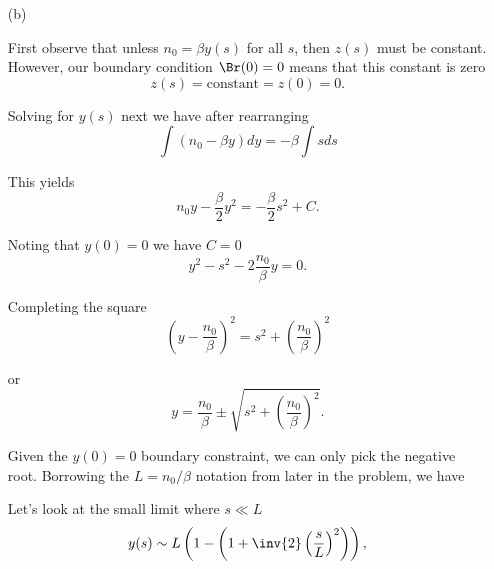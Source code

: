 {\begin{enumerate}
We have two non-trivial differential equations to solve.

\item[(b)]

First observe that unless \(n_0 = \beta y(s)\) for all \(s\), then \(z(s)\) must be constant.  However, our boundary condition \(\Br(0) = 0\) means that this constant is zero
%
\begin{equation}\label{eqn:modernOpticsProblemSet1P2:110}
z(s) = \text{constant} = z(0) = 0.
\end{equation}

Solving for \(y(s)\) next we have after rearranging
%
\begin{dmath}\label{eqn:modernOpticsProblemSet1P2:130}
\int \left( n_0 - \beta y \right) dy = -\beta \int s ds
\end{dmath}

This yields
%
\begin{dmath}\label{eqn:modernOpticsProblemSet1P2:150}
n_0 y - \frac{\beta}{2} y^2 = -\frac{\beta}{2} s^2 + C.
\end{dmath}

Noting that \(y(0) = 0\) we have \(C = 0\)
%
\begin{dmath}\label{eqn:modernOpticsProblemSet1P2:170}
y^2 - s^2 - 2 \frac{n_0}{\beta} y = 0.
\end{dmath}

Completing the square
%
\begin{dmath}\label{eqn:modernOpticsProblemSet1P2:230}
\left( y - \frac{n_0}{\beta} \right)^2 = s^2 + \left( \frac{n_0}{\beta} \right)^2
\end{dmath}

or
%
\begin{dmath}\label{eqn:modernOpticsProblemSet1P2:190}
y = \frac{n_0}{\beta} \pm \sqrt{ s^2 + \left( \frac{n_0}{\beta} \right)^2 }.
\end{dmath}

Given the \(y(0) = 0\) boundary constraint, we can only pick the negative root.  Borrowing the \(L = n_0/\beta\) notation from later in the problem, we have


Let's look at the small limit where \(s \ll L\)
%
\begin{dmath}\label{eqn:modernOpticsProblemSet1P2:250}
y(s)
\sim L \left( 1 - \left( 1 + \inv{2} \left(\frac{s}{L}\right)^2 \right) \right),
\end{dmath}


\end{enumerate}}
